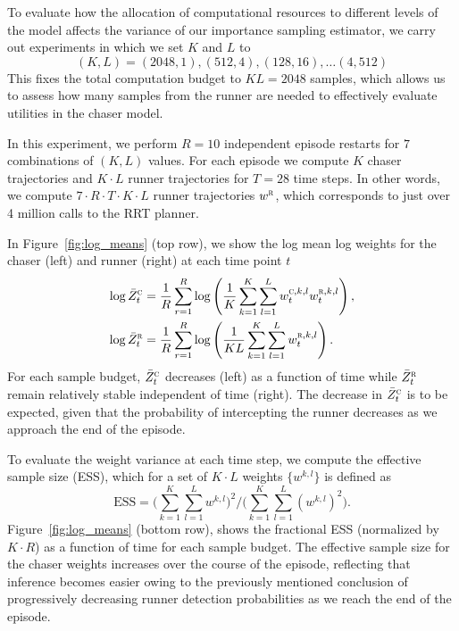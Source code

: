 \documentclass{article}
\begin{document}
To evaluate how the allocation of computational resources to different levels of the model affects the variance of our importance sampling estimator, we carry out experiments in which we set $K$ and $L$ to
\[
    (K,L) = (2048,1), (512, 4), (128, 16), \ldots (4,512)
\]
This fixes the total computation budget to $K L = 2048$ samples, which allows us to assess how many samples from the runner are needed to effectively evaluate utilities in the chaser model.


In this experiment, we perform $R=10$ independent episode restarts for $7$ combinations of $(K,L)$ values. For each episode we compute $K$ chaser trajectories and $K \cdot L$ runner trajectories for  $T= 28$ time steps. In other words, we compute $7 \cdot R \cdot T \cdot K \cdot L$ runner trajectories $w^{\textsc{r}}$, which corresponds to just over 4 million calls to the RRT planner.


In Figure~\ref{fig:log_means} (top row), we show the log mean log weights for the chaser (left) and runner (right) at each time point $t$ %
\begin{align*}
    \log
    \bar{Z}^\textsc{c}_t 
    &=\frac{1}{R}
    \sum_{r=1}^R 
    \log 
    \left(
    \frac{1}{K}
    \sum_{k=1}^K
    \sum_{l=1}^L
    w^{\textsc{c},k,l}_t
    w^{\textsc{r},k,l}_t
    \right),
    \\
    \log
    \bar{Z}^\textsc{r}_t 
    &=\frac{1}{R}
    \sum_{r=1}^R 
    \log 
    \left(
    \frac{1}{KL}
    \sum_{k=1}^K
    \sum_{l=1}^L
    w^{\textsc{r},k,l}_t
    \right).
\end{align*}
For each sample budget, $\bar{Z}^\textsc{c}_t$ decreases (left) as a function of time while $\bar{Z}^\textsc{r}_t$ remain relatively stable independent of time (right). The decrease in $\bar{Z}^\textsc{c}_t$ is to be expected, given that the probability of intercepting the runner decreases as we approach the end of the episode.

To evaluate the weight variance at each time step, we compute the effective sample size (ESS), which for a set of $K \cdot L$ weights $\{w^{k,l}\}$ is defined as 
\[
    \textstyle \text{ESS} 
    = 
    \Big(
        \sum_{k=1}^K \sum_{l=1}^L w^{k,l} 
    \Big)^2 
    / 
    \Big( 
        \sum_{k=1}^K \sum_{l=1}^L (w^{k,l})^2
    \Big).
\]
Figure~\ref{fig:log_means} (bottom row), shows the fractional ESS %
(normalized by $K \cdot R$) %
as a function of time for each sample budget. The effective sample size for the chaser weights increases over the course of the episode, reflecting that inference becomes easier owing to the previously mentioned conclusion of progressively decreasing runner detection probabilities as we reach the end of the episode.
\end{document}
